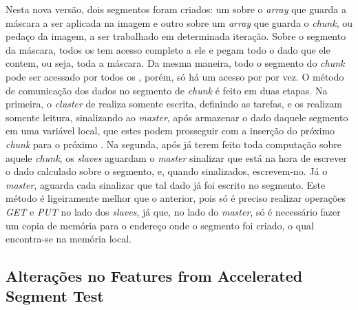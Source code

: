 \documentclass[a4paper,11pt]{article}
\begin{document}
Nesta nova versão, dois segmentos foram criados: um sobre o \textit{array} que guarda a máscara a ser aplicada na imagem e outro sobre um \textit{array} que guarda o \textit{chunk}, ou pedaço da imagem, a ser trabalhado em determinada iteração. Sobre o segmento da máscara, todos os \ccs tem acesso completo a ele e pegam todo o dado que ele contem, ou seja, toda a máscara. Da mesma maneira, todo o segmento do \textit{chunk} pode ser acessado por todos os \ccs, porém, só há um acesso por \cc por vez. O método de comunicação dos dados no segmento de \textit{chunk} é feito em duas etapas. Na primeira, o \textit{cluster} de \io realiza somente escrita, definindo as tarefas, e os \ccs realizam somente leitura, sinalizando ao \textit{master}, após armazenar o dado daquele segmento em uma variável local, que estes podem prosseguir com a inserção do próximo \textit{chunk} para o próximo \cc. Na segunda, após já terem feito toda computação sobre aquele \textit{chunk}, os \textit{slaves} aguardam o \textit{master} sinalizar que está na hora de escrever o dado calculado sobre o segmento, e, quando sinalizados, escrevem-no. Já o \textit{master}, aguarda cada \cc sinalizar que tal dado já foi escrito no segmento. Este método é ligeiramente melhor que o anterior, pois só é preciso realizar operações \textit{GET} e \textit{PUT} no lado dos \textit{slaves}, já que, no lado do \textit{master}, só é necessário fazer um copia de memória para o endereço onde o segmento foi criado, o qual encontra-se na memória local.

\subsection{Alterações no Features from Accelerated Segment Test}
\end{document}
